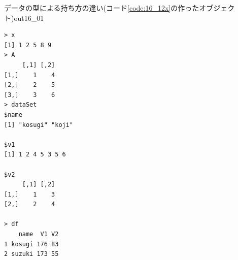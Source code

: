 \begin{Rscreen}{データの型による持ち方の違い(コード\ref{code:16_12x}の作ったオブジェクト)}{out16_01}
	\begin{verbatim}
> x
[1] 1 2 5 8 9
> A
     [,1] [,2]
[1,]    1    4
[2,]    2    5
[3,]    3    6
> dataSet
$name
[1] "kosugi" "koji"  

$v1
[1] 1 2 4 5 3 5 6

$v2
     [,1] [,2]
[1,]    1    3
[2,]    2    4

> df
    name  V1 V2
1 kosugi 176 83
2 suzuki 173 55\end{verbatim}
\end{Rscreen}
